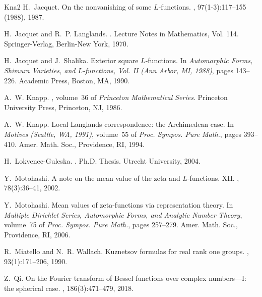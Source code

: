 \documentclass{amsproc}
\theoremstyle{plain}
\numberwithin{equation}{section}
\begin{document}
\begin{thebibliography}{Kna2}
	H.~Jacquet.
	\newblock On the nonvanishing of some {$L$}-functions.
	, 97(1-3):117--155 (1988),
	1987.
	
	H.~Jacquet and R.~P. Langlands.
	.
	\newblock Lecture Notes in Mathematics, Vol. 114. Springer-Verlag, Berlin-New
	York, 1970.
	
	H.~Jacquet and J.~Shalika.
	\newblock Exterior square {$L$}-functions.
	\newblock In {\em Automorphic {F}orms, {S}himura {V}arieties, and
		{$L$}-functions, {V}ol. {II} ({A}nn {A}rbor, {MI}, 1988)}, pages 143--226.
	Academic Press, Boston, MA, 1990.
	
	A.~W. Knapp.
	, volume~36 of {\em Princeton Mathematical Series}.
	\newblock Princeton University Press, Princeton, NJ, 1986.
	
	A.~W. Knapp.
	\newblock Local {L}anglands correspondence: the {A}rchimedean case.
	\newblock In {\em Motives ({S}eattle, {WA}, 1991)}, volume~55 of {\em Proc.
		Sympos. Pure Math.}, pages 393--410. Amer. Math. Soc., Providence, RI, 1994.
	
	H.~Lokvenec-Guleska.
	.
	\newblock Ph.D. Thesis. Utrecht University, 2004.
	
	Y.~Motohashi.
	\newblock A note on the mean value of the zeta and {$L$}-functions. {XII}.
	, 78(3):36--41, 2002.
	
	Y.~Motohashi.
	\newblock Mean values of zeta-functions via representation theory.
	\newblock In {\em Multiple {D}irichlet {S}eries, {A}utomorphic {F}orms, and
		{A}nalytic {N}umber {T}heory}, volume~75 of {\em Proc. Sympos. Pure Math.},
	pages 257--279. Amer. Math. Soc., Providence, RI, 2006.
	
	R.~Miatello and N.~R. Wallach.
	\newblock Kuznetsov formulas for real rank one groups.
	, 93(1):171--206, 1990.
	
	Z.~Qi.
	\newblock On the {F}ourier transform of {B}essel functions over complex
	numbers---{I}: the spherical case.
	, 186(3):471--479, 2018.
	

\end{thebibliography}
\end{document}
